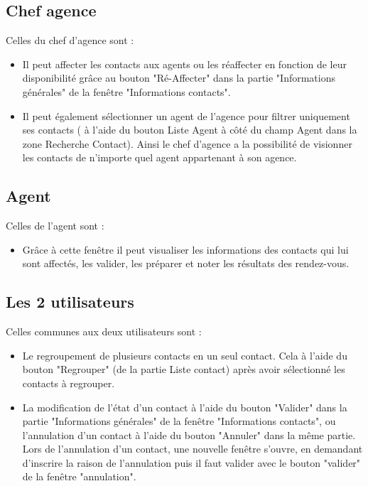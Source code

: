        \subsection{Chef agence}
              Celles du chef d'agence sont :
              \begin{itemize}
                  \item Il peut affecter les contacts aux agents ou les réaffecter en fonction de leur disponibilité grâce au bouton "Ré-Affecter" dans la partie "Informations générales" de la fenêtre "Informations contacts".
                  \item Il peut également sélectionner un agent de l'agence pour filtrer uniquement ses contacts ( à l'aide du bouton Liste Agent à côté du champ Agent dans la zone Recherche Contact). Ainsi le chef d’agence a la possibilité de visionner les contacts de n’importe quel agent appartenant à son agence.
              \end{itemize}

       \subsection{Agent}
              Celles de l'agent sont :
              \begin{itemize}
                  \item Grâce à cette fenêtre il peut visualiser les informations des contacts qui lui sont affectés, les valider, les préparer et noter les résultats des rendez-vous.
              \end{itemize}

       \subsection{Les 2 utilisateurs}
              Celles communes aux deux utilisateurs sont :
              \begin{itemize}
                  \item Le regroupement de plusieurs contacts en un seul contact. Cela à l'aide du bouton "Regrouper" (de la partie Liste contact) après avoir sélectionné les contacts à regrouper.
                  \item La modification de l'état d'un contact à l'aide du bouton "Valider" dans la partie "Informations générales" de la fenêtre "Informations contacts", ou l'annulation d'un contact à l'aide du bouton "Annuler" dans la même partie. Lors de l'annulation d'un contact, une nouvelle fenêtre s'ouvre, en demandant d'inscrire la raison de l'annulation puis il faut valider avec le bouton "valider" de la fenêtre "annulation".
              \end{itemize}


